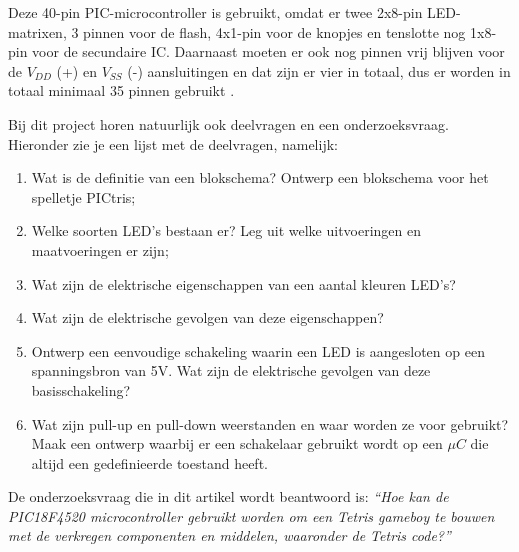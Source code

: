 Deze 40-pin PIC-microcontroller is gebruikt, omdat er twee 2x8-pin LED-matrixen, 3 pinnen voor de flash, 4x1-pin voor de knopjes en tenslotte nog 1x8-pin voor de secundaire IC. 
Daarnaast moeten er ook nog pinnen vrij blijven voor de \(V_{DD}\) (+) en \(V_{SS}\) (-) aansluitingen en dat zijn er vier in totaal, dus er worden in totaal minimaal 35 pinnen gebruikt \cite{PIC18F4520}.

Bij dit project horen natuurlijk ook deelvragen en een onderzoeksvraag. Hieronder zie je een lijst met de deelvragen, namelijk: 
\begin{enumerate}
    \item Wat is de definitie van een blokschema? Ontwerp een blokschema voor het spelletje PICtris;
    \item Welke soorten LED's bestaan er? Leg uit welke uitvoeringen en maatvoeringen er zijn;
    \item Wat zijn de elektrische eigenschappen van een aantal kleuren LED's?
    \item Wat zijn de elektrische gevolgen van deze eigenschappen?
    \item Ontwerp een eenvoudige schakeling waarin een LED is aangesloten op een spanningsbron van 5V. Wat zijn de elektrische gevolgen van deze basisschakeling? 
    \item Wat zijn pull-up en pull-down weerstanden en waar worden ze voor gebruikt? Maak een ontwerp waarbij er een schakelaar gebruikt wordt op een \(\mu C\) die altijd een gedefinieerde toestand heeft.
\end{enumerate}

De onderzoeksvraag die in dit artikel wordt beantwoord is:
\textit{``Hoe kan de PIC18F4520 microcontroller gebruikt worden om een Tetris gameboy te bouwen met de verkregen componenten en middelen, waaronder de Tetris code?''}